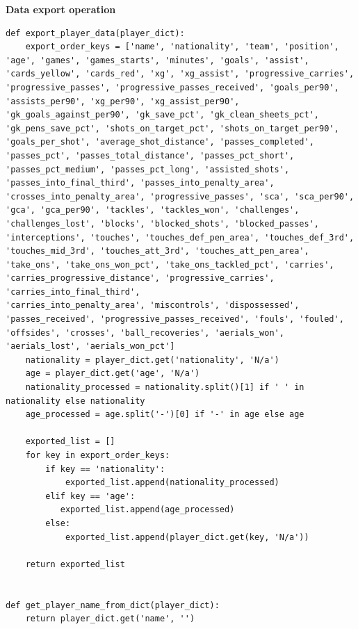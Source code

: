 \documentclass[12pt]{report}
\begin{document}
{\textbf*{Data export operation} %
\begin{lstlisting}
def export_player_data(player_dict):
    export_order_keys = ['name', 'nationality', 'team', 'position', 'age', 'games', 'games_starts', 'minutes', 'goals', 'assist', 'cards_yellow', 'cards_red', 'xg', 'xg_assist', 'progressive_carries', 'progressive_passes', 'progressive_passes_received', 'goals_per90', 'assists_per90', 'xg_per90', 'xg_assist_per90', 'gk_goals_against_per90', 'gk_save_pct', 'gk_clean_sheets_pct', 'gk_pens_save_pct', 'shots_on_target_pct', 'shots_on_target_per90', 'goals_per_shot', 'average_shot_distance', 'passes_completed', 'passes_pct', 'passes_total_distance', 'passes_pct_short', 'passes_pct_medium', 'passes_pct_long', 'assisted_shots', 'passes_into_final_third', 'passes_into_penalty_area', 'crosses_into_penalty_area', 'progressive_passes', 'sca', 'sca_per90', 'gca', 'gca_per90', 'tackles', 'tackles_won', 'challenges', 'challenges_lost', 'blocks', 'blocked_shots', 'blocked_passes', 'interceptions', 'touches', 'touches_def_pen_area', 'touches_def_3rd', 'touches_mid_3rd', 'touches_att_3rd', 'touches_att_pen_area', 'take_ons', 'take_ons_won_pct', 'take_ons_tackled_pct', 'carries', 'carries_progressive_distance', 'progressive_carries', 'carries_into_final_third',
'carries_into_penalty_area', 'miscontrols', 'dispossessed', 'passes_received', 'progressive_passes_received', 'fouls', 'fouled', 'offsides', 'crosses', 'ball_recoveries', 'aerials_won', 'aerials_lost', 'aerials_won_pct']
    nationality = player_dict.get('nationality', 'N/a')
    age = player_dict.get('age', 'N/a')
    nationality_processed = nationality.split()[1] if ' ' in nationality else nationality
    age_processed = age.split('-')[0] if '-' in age else age

    exported_list = []
    for key in export_order_keys:
        if key == 'nationality':
            exported_list.append(nationality_processed)
        elif key == 'age':
           exported_list.append(age_processed)
        else:
            exported_list.append(player_dict.get(key, 'N/a'))

    return exported_list


def get_player_name_from_dict(player_dict):
    return player_dict.get('name', '')


\end{lstlisting}}
\end{document}
